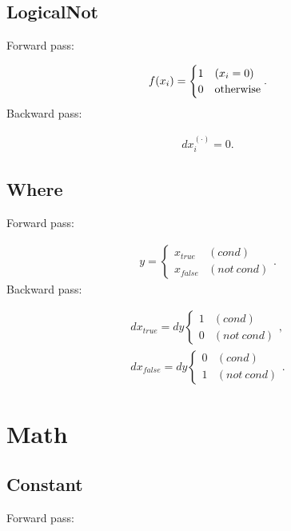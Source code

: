 \documentclass{article}
\begin{document}
\subsection{LogicalNot}

Forward pass:

\begin{eqnarray}
  f(x_i) = \begin{cases}
    1 & (x_i = 0) \\
    0 & {\rm otherwise}
  \end{cases}.
\end{eqnarray}
%
Backward pass:

\begin{eqnarray}
  dx^{(\cdot)}_i = 0.
\end{eqnarray}

\subsection{Where}

Forward pass:

\begin{eqnarray}
  y = \begin{cases}
    x_{true}  & (cond) \\
    x_{false} & (not \ cond)
  \end{cases}.
\end{eqnarray}
%
Backward pass:

\begin{eqnarray}
  dx_{true} = dy \begin{cases}
    1  & (cond) \\
    0 & (not\ cond)
  \end{cases}, \\
  dx_{false} = dy \begin{cases}
    0 & (cond) \\
    1 & (not\ cond)
  \end{cases}.
\end{eqnarray}


\section{Math}
\label{sec:Math}

\subsection{Constant}

Forward pass:
\end{document}
